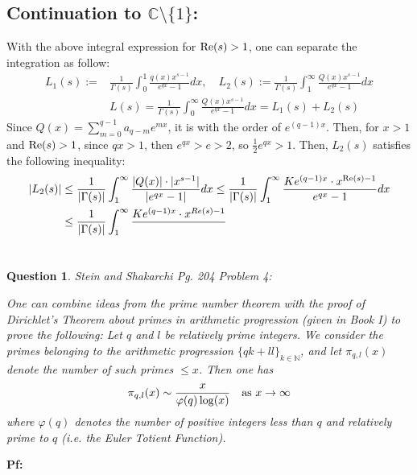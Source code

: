 \documentclass{article}
\newtheorem{question}{Question}
\begin{document}
\subsection{Continuation to $\mathbb{C}\setminus\{1\}$:}
With the above integral expression for $\textmd{Re}(s)>1$, one can separate the integration as follow:
\begin{equation}
    \label{eq:6}
    \begin{split}
        L_1(s):=&\frac{1}{\Gamma(s)}\int_{0}^{1}\frac{q(x)x^{s-1}}{e^{qx}-1}dx,\quad L_2(s):=\frac{1}{\Gamma(s)}\int_{1}^{\infty}\frac{Q(x)x^{s-1}}{e^{qx}-1}dx\\
        &L(s) = \frac{1}{\Gamma(s)}\int_{0}^{\infty}\frac{Q(x)x^{s-1}}{e^{qx}-1}dx = L_1(s)+L_2(s)
    \end{split}
\end{equation}
Since $Q(x)=\sum_{m=0}^{q-1}a_{q-m}e^{mx}$, it is with the order of $e^{(q-1)x}$. Then, for $x>1$ and $\textmd{Re}(s)>1$, since $qx >1$, then $e^{qx}>e>2$, so $\frac{1}{2}e^{qx}>1$. Then, $L_2(s)$ satisfies the following inequality:
\begin{equation}
    \label{eq:7}
    \begin{split}
        |L_2(s)|&\leq \frac{1}{|\Gamma(s)|}\int_{1}^{\infty}\frac{|Q(x)|\cdot|x^{s-1}|}{|e^{qx}-1|}dx \leq \frac{1}{|\Gamma(s)|}\int_{1}^{\infty}\frac{Ke^{(q-1)x}\cdot x^{\textmd{Re}(s)-1}}{e^{qx}-1}dx\\
        &\leq \frac{1}{|\Gamma(s)|}\int_{1}^{\infty}\frac{Ke^{(q-1)x}\cdot x^{Re(s)-1}}{}
    \end{split}
\end{equation}

\break

\section{}
\begin{question}\label{q:2}
    Stein and Shakarchi Pg. 204 Problem 4:

    One can combine ideas from the prime number theorem with the proof of Dirichlet's Theorem about primes in arithmetic progression (given in Book I) to prove the following: Let $q$ and $l$ be relatively prime integers. We consider the primes belonging to the arithmetic progression $\{qk+ll\}_{k\in\mathbb{N}}$, and let $\pi_{q,l}(x)$ denote the number of such primes $\leq x$. Then one has 
    $$\pi_{q,l}(x)\sim \frac{x}{\varphi(q)\log(x)}\quad \textmd{as }x\rightarrow\infty$$
    where $\varphi(q)$ denotes the number of positive integers less than $q$ and relatively prime to $q$ (i.e. the Euler Totient Function).
\end{question}

\textbf{Pf:}
\end{document}
